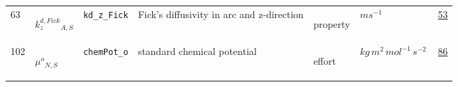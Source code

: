 \begin{longtable}{|p{1cm}|p{2.5cm}|p{4.5cm}|p{8cm}|p{3.0cm}|p{3cm}|p{1cm}|}
            63
             & \hypertarget{"v:63"}{ $ {{k^{d,Fick}_z}}{_{A, S}} $}
             & \verb|kd_z_Fick|
             & Fick's diffusivity in arc and z-direction 
             & \begin{lay}property \end{lay}
             & $ m s^{-1} \, $
             &                 \hyperlink{"e:53"}{ 53 }
                 \\
            102
             & \hypertarget{"v:102"}{ $ {{\mu^o}}{_{N, S}} $}
             & \verb|chemPot_o|
             & standard chemical potential
             & \begin{lay}effort \end{lay}
             & $ kg \,m^{2} \,mol^{-1} \,s^{-2} \, $
             &                 \hyperlink{"e:86"}{ 86 }
                 \\
    \end{longtable}